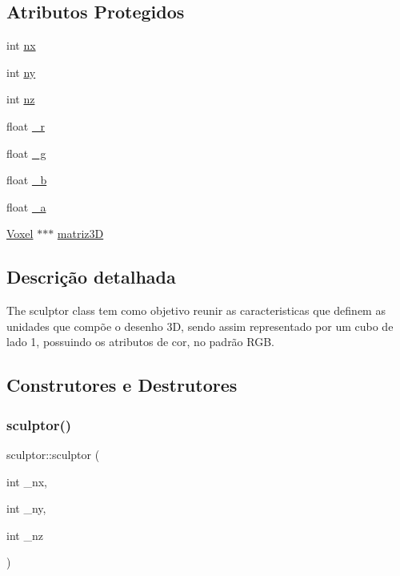 \subsection*{Atributos Protegidos}
\begin{DoxyCompactItemize}
\item 
int \mbox{\hyperlink{classsculptor_a5fa913adf55eb2aabf99d6dd0c848c0f}{nx}}
\item 
int \mbox{\hyperlink{classsculptor_aaaf8222a3f4216629443261e6b9d2e73}{ny}}
\item 
int \mbox{\hyperlink{classsculptor_aa9907276dba66f1f7a73b8f337c5f793}{nz}}
\item 
float \mbox{\hyperlink{classsculptor_a9833525d9f5fdef71d473b7f77364756}{\+\_\+r}}
\item 
float \mbox{\hyperlink{classsculptor_a0ed1383995072ec408e435240c893583}{\+\_\+g}}
\item 
float \mbox{\hyperlink{classsculptor_a1982061e6b45f8138453dcb550cf3bec}{\+\_\+b}}
\item 
float \mbox{\hyperlink{classsculptor_a03912b63e3c4e06c7aae17efc115f051}{\+\_\+a}}
\item 
\mbox{\hyperlink{struct_voxel}{Voxel}} $\ast$$\ast$$\ast$ \mbox{\hyperlink{classsculptor_a2d777d79278a01afcf83a9a257c12c73}{matriz3D}}
\end{DoxyCompactItemize}


\subsection{Descrição detalhada}
The sculptor class tem como objetivo reunir as caracteristicas que definem as unidades que compõe o desenho 3D, sendo assim representado por um cubo de lado 1, possuindo os atributos de cor, no padrão R\+GB. 

\subsection{Construtores e Destrutores}
\mbox{\label{classsculptor_a7ee1a5fad8c2976b8cc0d781eab131fa}} 
\subsubsection{\texorpdfstring{sculptor()}{sculptor()}}
{\footnotesize\ttfamily sculptor\+::sculptor (\begin{DoxyParamCaption}\item[{int}]{\+\_\+nx,  }\item[{int}]{\+\_\+ny,  }\item[{int}]{\+\_\+nz }\end{DoxyParamCaption})}



